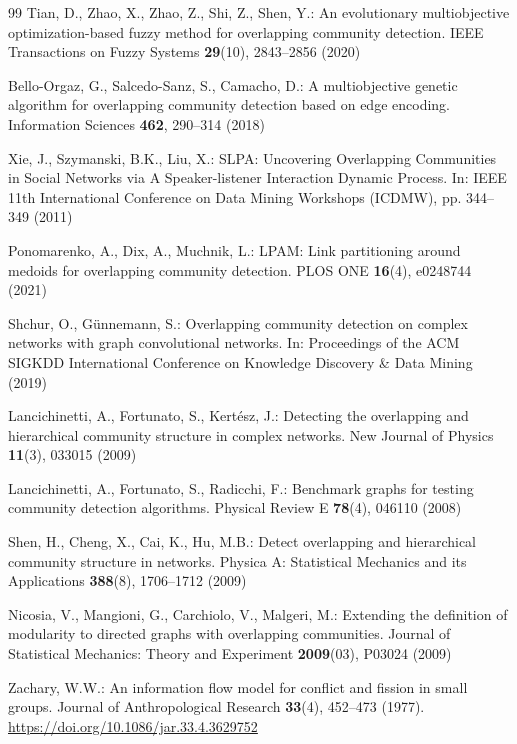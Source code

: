 \documentclass{svproc}
\begin{document}
{\begin{thebibliography}{99}
Tian, D., Zhao, X., Zhao, Z., Shi, Z., Shen, Y.: An evolutionary multiobjective optimization-based fuzzy method for overlapping community detection. IEEE Transactions on Fuzzy Systems \textbf{29}(10), 2843--2856 (2020)

Bello-Orgaz, G., Salcedo-Sanz, S., Camacho, D.: A multiobjective genetic algorithm for overlapping community detection based on edge encoding. Information Sciences \textbf{462}, 290--314 (2018)

Xie, J., Szymanski, B.K., Liu, X.: SLPA: Uncovering Overlapping Communities in Social Networks via A Speaker-listener Interaction Dynamic Process. In: IEEE 11th International Conference on Data Mining Workshops (ICDMW), pp. 344--349 (2011)

Ponomarenko, A., Dix, A., Muchnik, L.: LPAM: Link partitioning around medoids for overlapping community detection. PLOS ONE \textbf{16}(4), e0248744 (2021)

Shchur, O., G{\"u}nnemann, S.: Overlapping community detection on complex networks with graph convolutional networks. In: Proceedings of the ACM SIGKDD International Conference on Knowledge Discovery \& Data Mining (2019)

Lancichinetti, A., Fortunato, S., Kert{\'e}sz, J.: Detecting the overlapping and hierarchical community structure in complex networks. New Journal of Physics \textbf{11}(3), 033015 (2009)

Lancichinetti, A., Fortunato, S., Radicchi, F.: Benchmark graphs for testing community detection algorithms. Physical Review E \textbf{78}(4), 046110 (2008)

Shen, H., Cheng, X., Cai, K., Hu, M.B.: Detect overlapping and hierarchical community structure in networks. Physica A: Statistical Mechanics and its Applications \textbf{388}(8), 1706--1712 (2009)

Nicosia, V., Mangioni, G., Carchiolo, V., Malgeri, M.: Extending the definition of modularity to directed graphs with overlapping communities. Journal of Statistical Mechanics: Theory and Experiment \textbf{2009}(03), P03024 (2009)

Zachary, W.W.: An information flow model for conflict and fission in small groups. Journal of Anthropological Research \textbf{33}(4), 452--473 (1977). \url{https://doi.org/10.1086/jar.33.4.3629752}


\end{thebibliography}}
\end{document}
